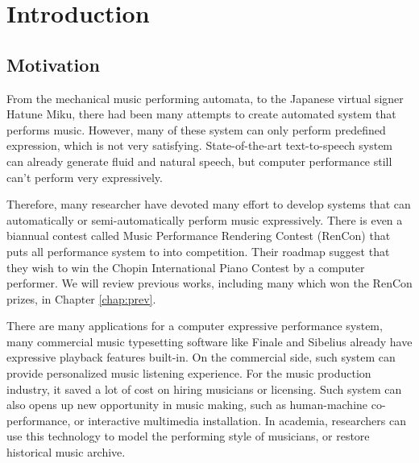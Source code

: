 \chapter{Introduction}
\section{Motivation}
From the mechanical music performing automata, to the Japanese virtual signer Hatune Miku, there had been many attempts to create automated system that performs music. However, many of these system can only perform predefined expression, which is not very satisfying. State-of-the-art text-to-speech system can already generate fluid and natural speech, but computer performance still can't perform very expressively.

Therefore, many researcher have devoted many effort to develop systems that can automatically or semi-automatically perform music expressively. There is even a biannual contest called Music Performance Rendering Contest (RenCon)\cite{RenCon} that puts all performance system to into competition. Their roadmap suggest that they wish to win the Chopin International Piano Contest by a computer performer. We will review previous works, including many which won the RenCon prizes, in Chapter \ref{chap:prev}.


There are many applications for a computer expressive performance system, many commercial music typesetting software like Finale and Sibelius already have expressive playback features built-in. On the commercial side, such system can provide personalized music listening experience. For the music production industry, it saved a lot of cost on hiring musicians or licensing. Such system can also opens up new opportunity in music making, such as human-machine co-performance, or interactive multimedia installation. In academia, researchers can use this technology to model the performing style of musicians, or restore historical music archive.

